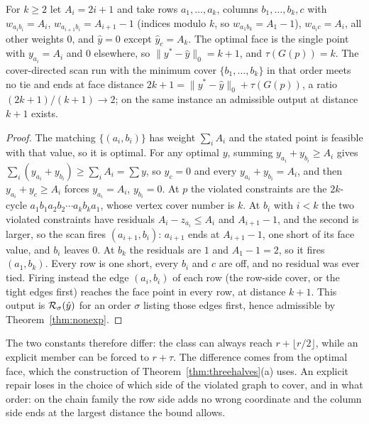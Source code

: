 \begin{proposition}\label{prop:chainfam}
For $k \ge 2$ let $A_i = 2i + 1$ and take rows $a_1, \dots, a_k$, columns $b_1, \dots, b_k, c$ with
$w_{a_i b_i} = A_i$, $w_{a_{i+1} b_i} = A_{i+1} - 1$ (indices modulo $k$, so $w_{a_1 b_k} = A_1 - 1$),
$w_{a_i c} = A_i$, all other weights $0$, and $\hat y = 0$ except $\hat y_c = A_k$. The optimal face
is the single point with $y_{a_i} = A_i$ and $0$ elsewhere, so $\|y^* - \hat y\|_0 = k + 1$, and
$\tau(G(p)) = k$. The cover-directed scan run with the minimum cover $\{b_1, \dots, b_k\}$ in that
order meets no tie and ends at face distance $2k + 1 = \|y^* - \hat y\|_0 + \tau(G(p))$, a ratio
$(2k+1)/(k+1) \to 2$; on the same instance an admissible output at distance $k + 1$ exists.
\end{proposition}

\begin{proof}
The matching $\{(a_i, b_i)\}$ has weight $\sum_i A_i$ and the stated point is feasible with that
value, so it is optimal. For any optimal $y$, summing $y_{a_i} + y_{b_i} \ge A_i$ gives
$\sum_i (y_{a_i} + y_{b_i}) \ge \sum_i A_i = \sum y$, so $y_c = 0$ and every $y_{a_i} + y_{b_i} = A_i$,
and then $y_{a_i} + y_c \ge A_i$ forces $y_{a_i} = A_i$, $y_{b_i} = 0$. At $p$ the violated constraints
are the $2k$-cycle $a_1 b_1 a_2 b_2 \cdots a_k b_k a_1$, whose vertex cover number is $k$. At $b_i$
with $i < k$ the two violated constraints have residuals $A_i - z_{a_i} \le A_i$ and $A_{i+1} - 1$,
and the second is larger, so the scan fires $(a_{i+1}, b_i)$: $a_{i+1}$ ends at $A_{i+1} - 1$, one
short of its face value, and $b_i$ leaves $0$. At $b_k$ the residuals are $1$ and $A_1 - 1 = 2$, so
it fires $(a_1, b_k)$. Every row is one short, every $b_i$ and $c$ are off, and no residual was ever
tied. Firing instead the edge $(a_i, b_i)$ of each row (the row-side cover, or the tight edges
first) reaches the face point in every row, at distance $k + 1$. This output is
$\mathcal{R}_\sigma(\hat y)$ for an order $\sigma$ listing those edges first, hence admissible by
Theorem~\ref{thm:nonexp}.
\end{proof}

The two constants therefore differ: the class can always reach $r + \lfloor r/2 \rfloor$, while an
explicit member can be forced to $r + \tau$. The difference comes from the optimal face, which the
construction of Theorem~\ref{thm:threehalves}(a) uses. An explicit repair loses in the choice
of which side of the violated graph to cover, and in what order: on the chain family the row side
adds no wrong coordinate and the column side ends at the largest distance the bound allows.

